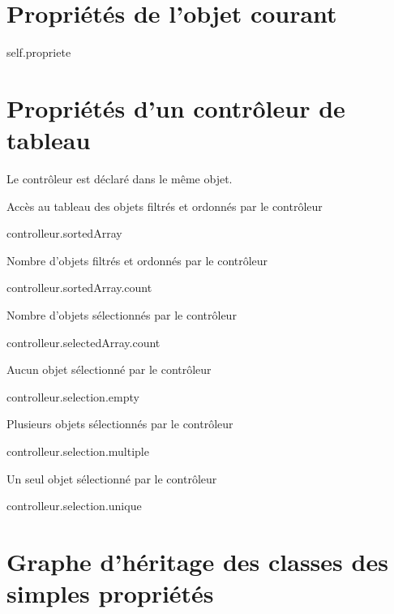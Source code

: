 



\section{Propriétés de l'objet courant}


\begin{ebcode}
self.propriete
\end{ebcode}



\section{Propriétés d'un contrôleur de tableau}

Le contrôleur est déclaré dans le même objet.

Accès au tableau des objets filtrés et ordonnés par le contrôleur
\begin{ebcode}
controlleur.sortedArray
\end{ebcode}

Nombre d'objets filtrés et ordonnés par le contrôleur
\begin{ebcode}
controlleur.sortedArray.count
\end{ebcode}

Nombre d'objets sélectionnés par le contrôleur
\begin{ebcode}
controlleur.selectedArray.count
\end{ebcode}

Aucun objet sélectionné par le contrôleur
\begin{ebcode}
controlleur.selection.empty
\end{ebcode}

Plusieurs objets sélectionnés par le contrôleur
\begin{ebcode}
controlleur.selection.multiple
\end{ebcode}

Un seul objet sélectionné par le contrôleur
\begin{ebcode}
controlleur.selection.unique
\end{ebcode}


\section{Graphe d'héritage des classes des simples propriétés}

